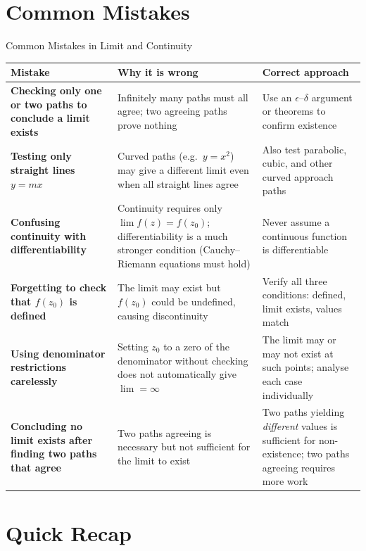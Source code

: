 \documentclass[12pt,a4paper]{article}
\begin{document}
\section{Common Mistakes}

\begin{mistakebox}{Common Mistakes in Limit and Continuity}
\begin{tabular}{>{\bfseries}p{4cm} p{5.5cm} p{5cm}}
\toprule
Mistake & Why it is wrong & Correct approach \\
\midrule
Checking only one or two paths to conclude a limit exists &
Infinitely many paths must all agree; two agreeing paths prove nothing &
Use an $\epsilon$--$\delta$ argument or theorems to confirm existence \\
\addlinespace
Testing only straight lines $y = mx$ &
Curved paths (e.g.\ $y = x^2$) may give a different limit even when
all straight lines agree &
Also test parabolic, cubic, and other curved approach paths \\
\addlinespace
Confusing continuity with differentiability &
Continuity requires only $\lim f(z) = f(z_0)$; differentiability is a much
stronger condition (Cauchy--Riemann equations must hold) &
Never assume a continuous function is differentiable \\
\addlinespace
Forgetting to check that $f(z_0)$ is defined &
The limit may exist but $f(z_0)$ could be undefined, causing discontinuity &
Verify all three conditions: defined, limit exists, values match \\
\addlinespace
Using denominator restrictions carelessly &
Setting $z_0$ to a zero of the denominator without checking does not
automatically give $\lim = \infty$ &
The limit may or may not exist at such points; analyse each case individually \\
\addlinespace
Concluding no limit exists after finding two paths that agree &
Two paths agreeing is necessary but not sufficient for the limit to exist &
Two paths yielding \emph{different} values is sufficient for non-existence;
two paths agreeing requires more work \\
\bottomrule
\end{tabular}
\end{mistakebox}

\section{Quick Recap}
\end{document}
